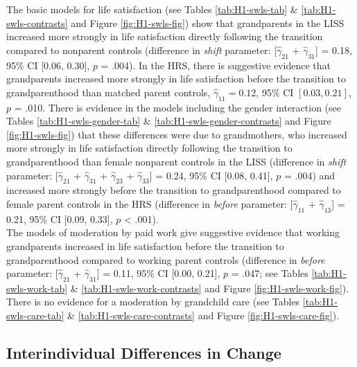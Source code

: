 \documentclass[
  english,
  man, noextraspace]{apa7}
\begin{document}
The basic models for life satisfaction (see Tables \ref{tab:H1-swls-tab} \& \ref{tab:H1-swls-contrasts} and Figure \ref{fig:H1-swls-fig}) show that grandparents in the LISS increased more strongly in life satisfaction directly following the transition compared to nonparent controls (difference in \emph{shift} parameter: {[}\(\hat{\gamma}_{21}\) + \(\hat{\gamma}_{31}\){]} = 0.18, 95\% CI {[}0.06, 0.30{]}, \(p\) = .004). In the HRS, there is suggestive evidence that grandparents increased more strongly in life satisfaction before the transition to grandparenthood than matched parent controls, \(\hat{\gamma}_{11} = 0.12\), 95\% CI \([0.03, 0.21]\), \(p\) = .010. There is evidence in the models including the gender interaction (see Tables \ref{tab:H1-swls-gender-tab} \& \ref{tab:H1-swls-gender-contrasts} and Figure \ref{fig:H1-swls-fig}) that these differences were due to grandmothers, who increased more strongly in life satisfaction directly following the transition to grandparenthood than female nonparent controls in the LISS (difference in \emph{shift} parameter: {[}\(\hat{\gamma}_{21}\) + \(\hat{\gamma}_{31}\) + \(\hat{\gamma}_{23}\) + \(\hat{\gamma}_{33}\){]} = 0.24, 95\% CI {[}0.08, 0.41{]}, \(p\) = .004) and increased more strongly before the transition to grandparenthood compared to female parent controls in the HRS (difference in \emph{before} parameter: {[}\(\hat{\gamma}_{11}\) + \(\hat{\gamma}_{13}\){]} = 0.21, 95\% CI {[}0.09, 0.33{]}, \(p\) \textless{} .001).\\
The models of moderation by paid work give suggestive evidence that working grandparents increased in life satisfaction before the transition to grandparenthood compared to working parent controls (difference in \emph{before} parameter: {[}\(\hat{\gamma}_{21}\) + \(\hat{\gamma}_{31}\){]} = 0.11, 95\% CI {[}0.00, 0.21{]}, \(p\) = .047; see Tables \ref{tab:H1-swls-work-tab} \& \ref{tab:H1-swls-work-contrasts} and Figure \ref{fig:H1-swls-work-fig}). There is no evidence for a moderation by grandchild care (see Tables \ref{tab:H1-swls-care-tab} \& \ref{tab:H1-swls-care-contrasts} and Figure \ref{fig:H1-swls-care-fig}).

\hypertarget{interindividual-differences-in-change}{%
\subsection{Interindividual Differences in Change}\label{interindividual-differences-in-change}}
\end{document}
